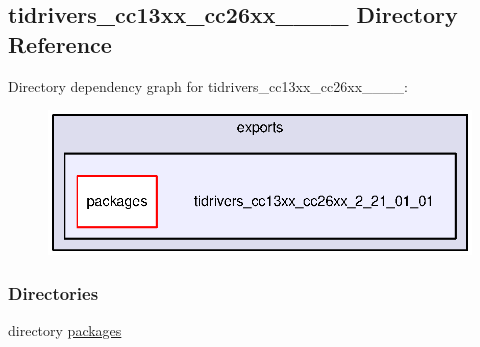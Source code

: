 \subsection{tidrivers\+\_\+cc13xx\+\_\+cc26xx\+\_\+\_\+\_\+\_ Directory Reference}
\label{dir_f6e916242039e0349c75a086e347d29e}
Directory dependency graph for tidrivers\+\_\+cc13xx\+\_\+cc26xx\+\_\+\_\+\_\+\_\+:
\nopagebreak
\begin{figure}[H]
\begin{center}
\leavevmode
\includegraphics[width=345pt]{dir_f6e916242039e0349c75a086e347d29e_dep}
\end{center}
\end{figure}
\subsubsection*{Directories}
\begin{DoxyCompactItemize}
\item 
directory \hyperlink{dir_66ebce97428d8a203c418c1e1c30b1d0}{packages}
\end{DoxyCompactItemize}
